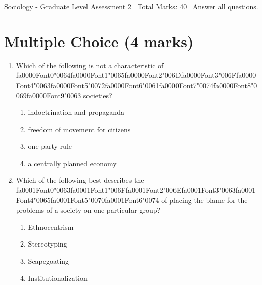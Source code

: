 \documentclass[12pt]{article}
\begin{document}
\begin{center}
Sociology - Graduate Level Assessment 2 \
Total Marks: 40 \
Answer all questions.
\end{center}

\section*{Multiple Choice (4 marks)}
\begin{enumerate}[label=\arabic*.]
\item Which of the following is not a characteristic of {\csname fa0000Font0\endcsname\char"0064}{\csname fa0000Font1\endcsname\char"0065}{\csname fa0000Font2\endcsname\char"006D}{\csname fa0000Font3\endcsname\char"006F}{\csname fa0000Font4\endcsname\char"0063}{\csname fa0000Font5\endcsname\char"0072}{\csname fa0000Font6\endcsname\char"0061}{\csname fa0000Font7\endcsname\char"0074}{\csname fa0000Font8\endcsname\char"0069}{\csname fa0000Font9\endcsname\char"0063} societies?
\begin{enumerate}[label=(\alph*)]
    \item indoctrination and propaganda
    \item freedom of movement for citizens
    \item one-party rule
    \item a centrally planned economy
\end{enumerate}
\item Which of the following best describes the {\csname fa0001Font0\endcsname\char"0063}{\csname fa0001Font1\endcsname\char"006F}{\csname fa0001Font2\endcsname\char"006E}{\csname fa0001Font3\endcsname\char"0063}{\csname fa0001Font4\endcsname\char"0065}{\csname fa0001Font5\endcsname\char"0070}{\csname fa0001Font6\endcsname\char"0074} of placing the blame for the problems of a society on one particular group?
\begin{enumerate}[label=(\alph*)]
    \item Ethnocentrism
    \item Stereotyping
    \item Scapegoating
    \item Institutionalization
\end{enumerate}
\end{enumerate}
\end{document}
